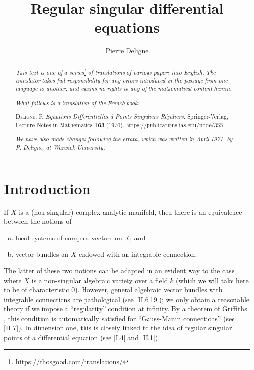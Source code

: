 \documentclass{report}
\title{Regular singular differential equations}
\author{Pierre Deligne}
\date{}
\theoremstyle{plain}
\theoremstyle{definition}
\newcommand{\oldpage}[1]{\marginpar{\footnotesize$\Big\vert$ \textit{p.~#1}}}
\begin{document}
\maketitle

\renewcommand{\abstractname}{Translator's note.}

\begin{abstract}
  \renewcommand*{\thefootnote}{\fnsymbol{footnote}}
  \emph{This text is one of a series\footnote{\url{https://thosgood.com/translations/}} of translations of various papers into English.}
  \emph{The translator takes full responsibility for any errors introduced in the passage from one language to another, and claims no rights to any of the mathematical content herein.}
  
  \emph{What follows is a translation of the French book:}

  \medskip\noindent
  \textsc{Deligne, P.}
  \emph{Equations Diff\'{e}rentielles \`{a} Points Singuliers R\'{e}guliers.}
  Springer-Verlag, Lecture Notes in Mathematics \textbf{163} (1970).
  {\footnotesize\url{https://publications.ias.edu/node/355}}

  \medskip
  \noindent\emph{We have also made changes following the errata, which was written in April 1971, by P. Deligne, at Warwick University.}
\end{abstract}

\setcounter{footnote}{0}

\tableofcontents




\setcounter{chapter}{-1}

\chapter{Introduction}
\label{0}

\oldpage{1}
If $X$ is a (non-singular) complex analytic manifold, then there is an equivalence between the notions of
\begin{enumerate}[a)]
  \item local systems of complex vectors on $X$; and
  \item vector bundles on $X$ endowed with an integrable connection.
\end{enumerate}

The latter of these two notions can be adapted in an evident way to the case where $X$ is a non-singular algebraic variety over a field $k$ (which we will take here to be of characteristic $0$).
However, general algebraic vector bundles with integrable connections are pathological (see \cref{II.6.19});
we only obtain a reasonable theory if we impose a ``regularity'' condition at infinity.
By a theorem of Griffiths \cite{8}, this condition is automatically satisfied for ``Gauss-Manin connections'' (see \cref{II.7}).
In dimension one, this is closely linked to the idea of regular singular points of a differential equation (see \cref{I.4} and \cref{II.1}).
\end{document}

